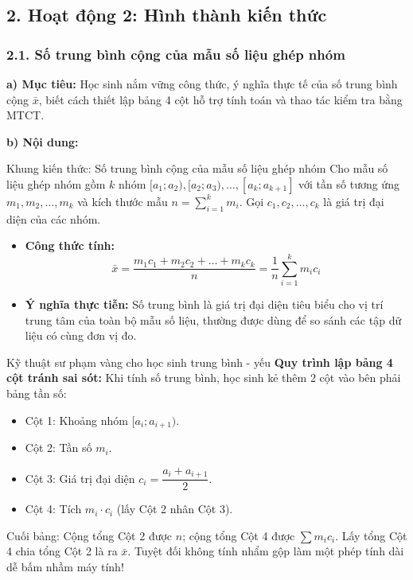 \documentclass[12pt, a4paper]{article}
\begin{document}
\subsection*{2. Hoạt động 2: Hình thành kiến thức}

\subsubsection*{2.1. Số trung bình cộng của mẫu số liệu ghép nhóm}

\noindent \textbf{a) Mục tiêu:}
Học sinh nắm vững công thức, ý nghĩa thực tế của số trung bình cộng $\bar{x}$, biết cách thiết lập bảng 4 cột hỗ trợ tính toán và thao tác kiểm tra bằng MTCT.

\noindent \textbf{b) Nội dung:}
\begin{pedabox}{Khung kiến thức: Số trung bình cộng của mẫu số liệu ghép nhóm}
Cho mẫu số liệu ghép nhóm gồm $k$ nhóm $[a_1; a_2), [a_2; a_3), \dots, [a_k; a_{k+1}]$ với tần số tương ứng $m_1, m_2, \dots, m_k$ và kích thước mẫu $n = \sum_{i=1}^k m_i$. Gọi $c_1, c_2, \dots, c_k$ là giá trị đại diện của các nhóm.
\begin{itemize}[leftmargin=0.6cm]
    \item \textbf{Công thức tính:}
    $$\bar{x} = \dfrac{m_1 c_1 + m_2 c_2 + \dots + m_k c_k}{n} = \dfrac{1}{n} \sum_{i=1}^k m_i c_i$$
    \item \textbf{Ý nghĩa thực tiễn:} Số trung bình là giá trị đại diện tiêu biểu cho vị trí trung tâm của toàn bộ mẫu số liệu, thường được dùng để so sánh các tập dữ liệu có cùng đơn vị đo.
\end{itemize}
\end{pedabox}

\begin{scaffoldbox}{Kỹ thuật sư phạm vàng cho học sinh trung bình - yếu}
\textbf{Quy trình lập bảng 4 cột tránh sai sót:}
Khi tính số trung bình, học sinh kẻ thêm 2 cột vào bên phải bảng tần số:
\begin{itemize}[leftmargin=0.6cm]
    \item Cột 1: Khoảng nhóm $[a_i; a_{i+1})$.
    \item Cột 2: Tần số $m_i$.
    \item Cột 3: Giá trị đại diện $c_i = \dfrac{a_i + a_{i+1}}{2}$.
    \item Cột 4: Tích $m_i \cdot c_i$ (lấy Cột 2 nhân Cột 3).
\end{itemize}
Cuối bảng: Cộng tổng Cột 2 được $n$; cộng tổng Cột 4 được $\sum m_i c_i$. Lấy tổng Cột 4 chia tổng Cột 2 là ra $\bar{x}$. Tuyệt đối không tính nhẩm gộp làm một phép tính dài dễ bấm nhầm máy tính!
\end{scaffoldbox}
\end{document}
